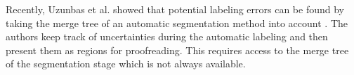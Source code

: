 Recently, Uzunbas et al. showed that potential labeling errors can be found by taking the merge tree of an automatic segmentation method into account \cite{uzunbas}. The authors keep track of uncertainties during the automatic labeling and then present them as regions for proofreading. This requires access to the merge tree of the segmentation stage which is not always available.



